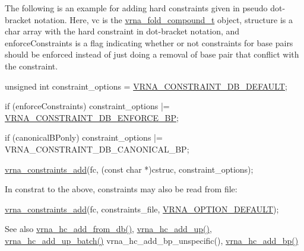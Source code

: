 The following is an example for adding hard constraints given in pseudo dot-\/bracket notation. Here, {\ttfamily vc} is the \hyperlink{group__fold__compound_ga1b0cef17fd40466cef5968eaeeff6166}{vrna\+\_\+fold\+\_\+compound\+\_\+t} object, {\ttfamily structure} is a char array with the hard constraint in dot-\/bracket notation, and {\ttfamily enforce\+Constraints} is a flag indicating whether or not constraints for base pairs should be enforced instead of just doing a removal of base pair that conflict with the constraint.


\begin{DoxyCodeInclude}
      \textcolor{keywordtype}{unsigned} \textcolor{keywordtype}{int} constraint\_options = \hyperlink{group__hard__constraints_ga1c3864bdc92147a4d93de2b1b4356177}{VRNA\_CONSTRAINT\_DB\_DEFAULT};

      \textcolor{keywordflow}{if} (enforceConstraints)
        constraint\_options |= \hyperlink{group__hard__constraints_ga29ebe940110d60ab798fdacbcdbbfb7d}{VRNA\_CONSTRAINT\_DB\_ENFORCE\_BP};

      \textcolor{keywordflow}{if} (canonicalBPonly)
        constraint\_options |= VRNA\_CONSTRAINT\_DB\_CANONICAL\_BP;

      \hyperlink{group__constraints_ga35a401f680969a556858a8dd5f1d07cc}{vrna\_constraints\_add}(fc, (\textcolor{keyword}{const} \textcolor{keywordtype}{char} *)cstruc, constraint\_options);
\end{DoxyCodeInclude}
 In constrat to the above, constraints may also be read from file\+:


\begin{DoxyCodeInclude}
    \hyperlink{group__constraints_ga35a401f680969a556858a8dd5f1d07cc}{vrna\_constraints\_add}(fc, constraints\_file, 
      \hyperlink{group__fold__compound_gacea5b7ee6181c485f36e2afa0e9089e4}{VRNA\_OPTION\_DEFAULT});
\end{DoxyCodeInclude}
 \begin{DoxySeeAlso}{See also}
\hyperlink{group__hard__constraints_ga5b4de3247b67358080c176b94591a8e6}{vrna\+\_\+hc\+\_\+add\+\_\+from\+\_\+db()}, \hyperlink{group__hard__constraints_ga447d88e06ad97bb225cd83310ace8345}{vrna\+\_\+hc\+\_\+add\+\_\+up()}, \hyperlink{group__hard__constraints_ga5070f296c8af2baea10951525519464f}{vrna\+\_\+hc\+\_\+add\+\_\+up\+\_\+batch()} vrna\+\_\+hc\+\_\+add\+\_\+bp\+\_\+unspecific(), \hyperlink{group__hard__constraints_ga7cba95ebe2ceb5ec9a5768f2232854fd}{vrna\+\_\+hc\+\_\+add\+\_\+bp()}
\end{DoxySeeAlso}

